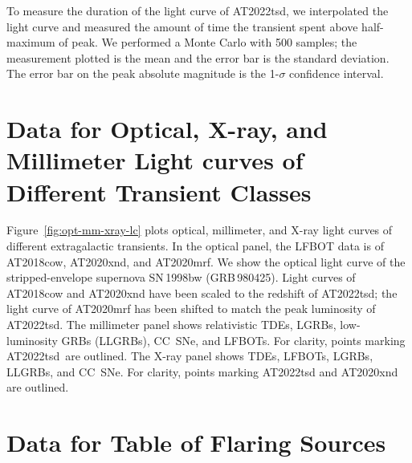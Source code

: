 \documentclass{nature_plusfigure}
\newcommand{\at}{AT2022tsd}
\begin{document}
\begin{methods}
To measure the duration of the light curve of \at, we interpolated the light curve and measured the amount of time the transient spent above half-maximum of peak. We performed a Monte Carlo with 500 samples; the measurement plotted is the mean and the error bar is the standard deviation. The error bar on the peak absolute magnitude is the 1-$\sigma$ confidence interval. 

\section{Data for Optical, X-ray, and Millimeter Light curves of Different Transient Classes}
\label{sec:data-transient-lc}


Figure~\ref{fig:opt-mm-xray-lc} plots optical, millimeter, and X-ray light curves of different extragalactic transients. In the optical panel, the LFBOT data is of AT2018cow\cite{Perley2019,Ho2019,RiveraSandoval2018,Margutti2019}, AT2020xnd\cite{Perley2021,Ho2022_AT2020xnd,Bright2022}, and AT2020mrf\cite{Yao2022}. We show the optical light curve of the stripped-envelope supernova SN\,1998bw\cite{Galama1998} (GRB\,980425).
Light curves of AT2018cow and AT2020xnd have been scaled to the redshift of \at; the light curve of AT2020mrf has been shifted to match the peak luminosity of \at. The millimeter panel shows relativistic TDEs\cite{Zauderer2011,Yuan2016,Andreoni2022}, LGRBs\cite{Sheth2003,Perley2014,Laskar2018,Laskar2019}, low-luminosity GRBs (LLGRBs\cite{Kulkarni1998,Perley2017}), CC~SNe\cite{Weiler2007,Soderberg2010,Horesh2013,Corsi2014,Maeda2021}, and LFBOTs\cite{Ho2019,Ho2022_AT2020xnd}. For clarity, points marking \at\ are outlined. The X-ray panel shows TDEs\cite{Mangano2016,Andreoni2022}, LFBOTs\cite{RiveraSandoval2018,Margutti2019,Ho2019,Coppejans2020,Ho2022_AT2020xnd,Bright2022,Yao2022}, LGRBs\cite{Yao2022}, LLGRBs\cite{Kouveliotou2004,Tiengo2004,Campana2006,Soderberg2006,Margutti2013}, and CC~SNe\cite{Dwarkadas2012}. For clarity, points marking AT2022tsd and AT2020xnd are outlined.

\section{Data for Table of Flaring Sources}
\label{sec:data-table}


\end{methods}
\end{document}

